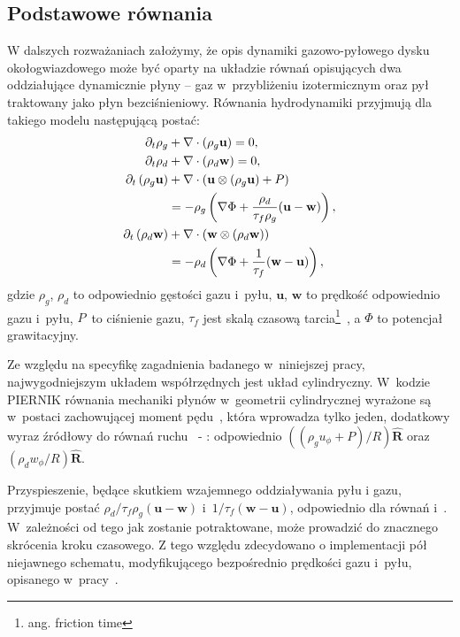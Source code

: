 \subsection{Podstawowe równania}
W dalszych rozważaniach założymy, że opis dynamiki gazowo-pyłowego dysku
okołogwiazdowego może być oparty na układzie równań opisujących dwa oddziałujące
dynamicznie płyny -- gaz w~przybliżeniu izotermicznym oraz  pył traktowany jako
płyn bezciśnieniowy. Równania hydrodynamiki przyjmują dla takiego modelu
następującą postać:
%
\begin{align}
   \partial_t \rho_g &+ \nabla\cdot\left(\rho_g\mathbf{u}\right) = 0,\label{eq1}\\
   \partial_t \rho_d &+ \nabla\cdot\left(\rho_d\mathbf{w}\right) = 0,\label{eq2}\\
\partial_t \left(\rho_g\mathbf{u}\right) &+
   \nabla\cdot(\mathbf{u}\otimes(\rho_g\mathbf{u})+P) \notag\\
 &= -\rho_g\left(\nabla\Phi +
\frac{\rho_d}{\tau_f\rho_g}(\mathbf{u}-\mathbf{w})\right),\label{eq3}\\
\partial_t \left(\rho_d\mathbf{w}\right) &+
\nabla\cdot(\mathbf{w}\otimes(\rho_d\mathbf{w})) \notag\\
 &= -\rho_d\left(\nabla\Phi + \frac{1}{\tau_f}(\mathbf{w}-\mathbf{u})\right),
\label{eq4}
\end{align}
gdzie $\rho_g$, $\rho_d$ to odpowiednio gęstości gazu i~pyłu, $\mathbf{u}$,
$\mathbf{w}$ to prędkość odpowiednio gazu i~pyłu, $P$~to ciśnienie gazu,
$\tau_f$ jest skalą czasową tarcia\footnote{ang. friction time}~,
a $\Phi$ to potencjał grawitacyjny.
%
\par Ze względu na specyfikę zagadnienia badanego w~niniejszej pracy,
najwygodniejszym układem współrzędnych jest układ cylindryczny. W~kodzie
\textsc{PIERNIK}
równania mechaniki płynów w~geometrii cylindrycznej wyrażone są w~postaci
zachowującej moment pędu~\cite{M07,SO10}, która wprowadza tylko jeden, dodatkowy
wyraz źródłowy do równań ruchu~ - : odpowiednio
$\left((\rho_g u_\phi + P) / R\right)\mathbf{\hat{R}}$ oraz $(\rho_d w_\phi / R)
\mathbf{\hat{R}}$.
%
\par Przyspieszenie, będące skutkiem wzajemnego oddziaływania pyłu i gazu,
przyjmuje postać $\rho_d/\tau_f\rho_g(\mathbf{u}-\mathbf{w})$
i~$1/\tau_f(\mathbf{w}-\mathbf{u})$, odpowiednio dla równań 
i~. W~zależności od tego jak zostanie potraktowane, może prowadzić do
znacznego skrócenia kroku czasowego. Z tego względu zdecydowano o implementacji
pół niejawnego schematu, modyfikującego bezpośrednio prędkości gazu i~pyłu,
opisanego w~pracy~\cite{TB09}.
%
